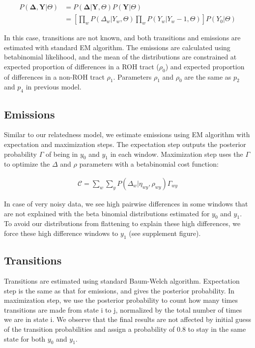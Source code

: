 \documentclass[12pt, letterpaper]{article}
\begin{document}
\begin{align}
    P(\mathbf{\Delta},\mathbf{Y}|\Theta) &= P(\mathbf{\Delta}|\mathbf{Y},\Theta) P(\mathbf{Y}|\Theta)\nonumber\\
 &= [\prod_{w} P(\Delta_w|Y_w, \Theta) \prod_{w} P(Y_w|Y_w-1, \Theta)] P(Y_0| \Theta)
\end{align}


In this case, transitions are not known, and both transitions and emissions are estimated with standard EM algorithm. The emissions are calculated using betabinomial likelihood, and the mean of the distributions are constrained at expected proportion of differences in a ROH tract ($\rho_{0}$) and expected proportion of differences in a non-ROH tract $\rho_{1}$. Parameters $\rho_{1}$ and $\rho_{0}$ are the same as $p_{2}$ and $p_4$ in previous model. 

\subsection{Emissions}
Similar to our relatedness model, we estimate emissions using EM algorithm with expectation and maximization steps. The expectation step outputs the posterior probability $\Gamma$ of being in $y_0$ and $y_1$ in each window. Maximization step uses the $\Gamma$ to optimize the $\Delta$ and $\rho$ parameters with a betabinomial cost function:

\begin{align}
\mathcal{C} = \sum_{w} \sum_{y} P(\Delta_w|\eta_{wy},\rho_{wy}) \Gamma_{wy} 
\end{align}

In case of very noisy data, we see high pairwise differences in some windows that are not explained with the beta binomial distributions estimated for $y_0$ and $y_1$. To avoid our distributions from flattening to explain these high differences, we force these high difference windows to $y_1$ (see supplement figure). 

\subsection{Transitions}
Transitions are estimated using standard Baum-Welch algorithm. Expectation step is the same as that for emissions, and gives the posterior probability. In maximization step, we use the posterior probability to count how many times transitions are made from state i to j, normalized by the total number of times we are in state i. We observe that the final results are not affected by initial guess of the transition probabilities and assign a probability of 0.8 to stay in the same state for both $y_0$ and $y_1$. 
\end{document}

